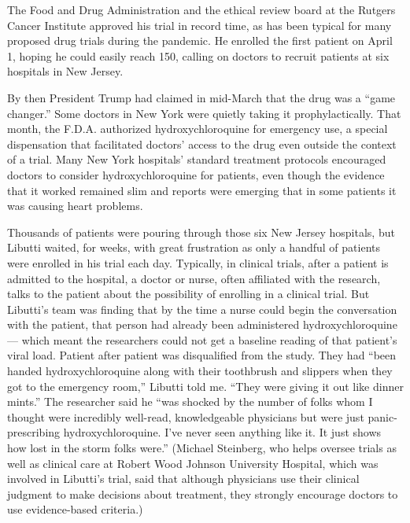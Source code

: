 The Food and Drug Administration and the ethical review board at the
Rutgers Cancer Institute approved his trial in record time, as has been
typical for many proposed drug trials during the pandemic. He enrolled
the first patient on April 1, hoping he could easily reach 150, calling
on doctors to recruit patients at six hospitals in New Jersey.

By then President Trump had claimed in mid-March that the drug was a
``game changer.'' Some doctors in New York were quietly taking it
prophylactically. That month, the F.D.A. authorized hydroxychloroquine
for emergency use, a special dispensation that facilitated doctors'
access to the drug even outside the context of a trial. Many New York
hospitals' standard treatment protocols encouraged doctors to consider
hydroxychloroquine for patients, even though the evidence that it worked
remained slim and reports were emerging that in some patients it was
causing heart problems.

Thousands of patients were pouring through those six New Jersey
hospitals, but Libutti waited, for weeks, with great frustration as only
a handful of patients were enrolled in his trial each day. Typically, in
clinical trials, after a patient is admitted to the hospital, a doctor
or nurse, often affiliated with the research, talks to the patient about
the possibility of enrolling in a clinical trial. But Libutti's team was
finding that by the time a nurse could begin the conversation with the
patient, that person had already been administered hydroxychloroquine
--- which meant the researchers could not get a baseline reading of that
patient's viral load. Patient after patient was disqualified from the
study. They had ``been handed hydroxychloroquine along with their
toothbrush and slippers when they got to the emergency room,'' Libutti
told me. ``They were giving it out like dinner mints.'' The researcher
said he ``was shocked by the number of folks whom I thought were
incredibly well-read, knowledgeable physicians but were just
panic-prescribing hydroxychloroquine. I've never seen anything like it.
It just shows how lost in the storm folks were.'' (Michael Steinberg,
who helps oversee trials as well as clinical care at Robert Wood Johnson
University Hospital, which was involved in Libutti's trial, said that
although physicians use their clinical judgment to make decisions about
treatment, they strongly encourage doctors to use evidence-based
criteria.)

